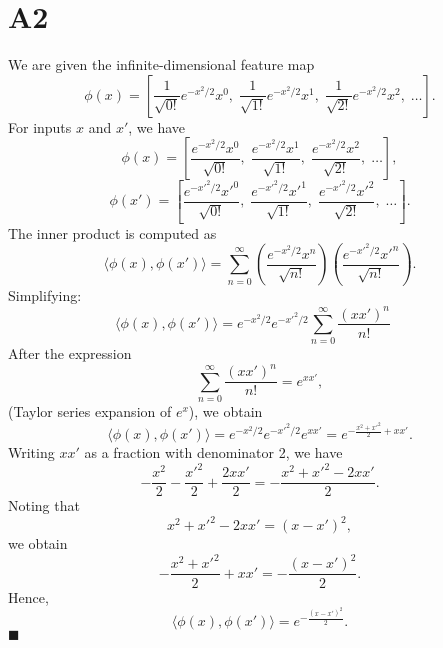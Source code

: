 \documentclass{article}
\begin{document}
\section*{A2}

We are given the infinite-dimensional feature map
\[
\phi(x) = \left[\frac{1}{\sqrt{0!}}e^{-x^2/2}x^0,\; \frac{1}{\sqrt{1!}}e^{-x^2/2}x^1,\; \frac{1}{\sqrt{2!}}e^{-x^2/2}x^2,\; \dots\right].
\]
For inputs \(x\) and \(x'\), we have
\[
\phi(x) = \left[\frac{e^{-x^2/2}x^0}{\sqrt{0!}},\; \frac{e^{-x^2/2}x^1}{\sqrt{1!}},\; \frac{e^{-x^2/2}x^2}{\sqrt{2!}},\; \dots\right],
\]
\[
\phi(x') = \left[\frac{e^{-x'^2/2}x'^0}{\sqrt{0!}},\; \frac{e^{-x'^2/2}x'^1}{\sqrt{1!}},\; \frac{e^{-x'^2/2}x'^2}{\sqrt{2!}},\; \dots\right].
\]
The inner product is computed as
\[
\langle \phi(x), \phi(x') \rangle = \sum_{n=0}^{\infty}\left(\frac{e^{-x^2/2}x^n}{\sqrt{n!}}\right)\left(\frac{e^{-x'^2/2}x'^n}{\sqrt{n!}}\right).
\]
Simplifying: 
\[
\langle \phi(x), \phi(x') \rangle = e^{-x^2/2}e^{-x'^2/2}\sum_{n=0}^{\infty}\frac{(xx')^n}{n!} \quad
\]
After the expression
\[
\sum_{n=0}^{\infty}\frac{(xx')^n}{n!} = e^{xx'},
\]
(Taylor series expansion of \(e^x\)), we obtain
\[
\langle \phi(x), \phi(x') \rangle = e^{-x^2/2}e^{-x'^2/2}e^{xx'} = e^{-\frac{x^2+x'^2}{2}+xx'}.
\]
Writing \(xx'\) as a fraction with denominator 2, we have
\[
-\frac{x^2}{2} - \frac{x'^2}{2} + \frac{2xx'}{2} = -\frac{x^2 + x'^2 - 2xx'}{2}.
\]
Noting that
\[
x^2 + x'^2 - 2xx' = (x-x')^2,
\]
we obtain
\[
-\frac{x^2+x'^2}{2}+xx' = -\frac{(x-x')^2}{2}.
\]
Hence,
\[
\boxed{\langle \phi(x), \phi(x') \rangle = e^{-\frac{(x-x')^2}{2}}.}
\]
\hfill\(\blacksquare\)
\end{document}
